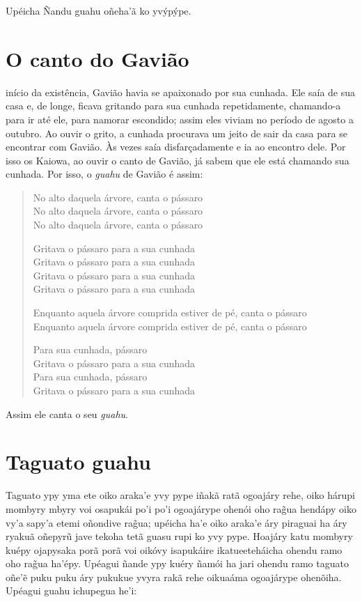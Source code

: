 Upéicha Ñandu guahu oñeha'ã ko yvýpýpe.

\chapter{O canto do Gavião}

 início da existência, Gavião havia se apaixonado por sua cunhada. Ele
saía de sua casa e, de longe, ficava gritando para sua cunhada
repetidamente, chamando-a para ir até ele, para namorar escondido; assim
eles viviam no período de agosto a outubro. Ao ouvir o grito, a cunhada
procurava um jeito de sair da casa para se encontrar com Gavião. Às
vezes saía disfarçadamente e ia ao encontro dele. Por isso os Kaiowa, ao
ouvir o canto de Gavião, já sabem que ele está chamando sua cunhada. Por
isso, o \emph{guahu} de Gavião é assim:

\begin{verse}
No alto daquela árvore, canta o pássaro\\
No alto daquela árvore, canta o pássaro\\
No alto daquela árvore, canta o pássaro

Gritava o pássaro para a sua cunhada\\
Gritava o pássaro para a sua cunhada\\
Gritava o pássaro para a sua cunhada\\
Gritava o pássaro para a sua cunhada

Enquanto aquela árvore comprida estiver de pé, canta o pássaro\\
Enquanto aquela árvore comprida estiver de pé, canta o pássaro

Para sua cunhada, pássaro\\
Gritava o pássaro para a sua cunhada\\
Para sua cunhada, pássaro\\
Gritava o pássaro para a sua cunhada
\end{verse}

Assim ele canta o seu \emph{guahu}.

\chapter{Taguato guahu}

Taguato ypy yma ete oiko araka'e yvy pype iñakã ratã ogoajáry rehe, oiko
hárupi mombyry mbyry voi osapukái po'i po'i ogoajárype ohenói oho rag̃ua
hendápy oiko vy'a sapy'a etemi oñondive rag̃ua; upéicha ha'e oiko araka'e
áry piraguai ha áry ryakuã oñepyrũ jave tekoha tetã guasu rupi ko yvy
pype. Hoajáry katu mombyry kuépy ojapysaka porã porã voi oikóvy
isapukáire ikatueeteháicha ohendu ramo oho rag̃ua ha'épy. Upéagui ñande
ypy kuéry ñamói ha jari ohendu ramo taguato oñe'ẽ puku puku áry pukukue
yvyra rakã rehe oikuaáma ogoajárype ohenõiha. Upéagui guahu ichupegua
he'i:

